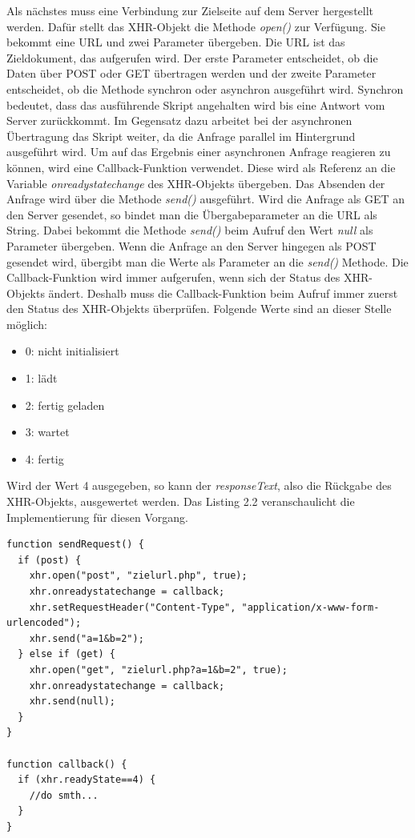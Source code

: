 Als n\"achstes muss eine Verbindung zur Zielseite auf dem Server hergestellt werden.
Daf\"ur stellt das XHR-Objekt die Methode \emph{open()} zur Verf\"ugung. 
Sie bekommt eine URL und zwei Parameter \"ubergeben.
Die URL ist das Zieldokument, das aufgerufen wird.
Der erste Parameter entscheidet, ob die Daten \"uber POST oder GET \"ubertragen werden und der zweite Parameter 
entscheidet, ob die Methode synchron oder asynchron ausgef\"uhrt wird.
Synchron bedeutet, dass das ausf\"uhrende Skript angehalten wird bis eine Antwort vom Server zur\"uckkommt.
Im Gegensatz dazu arbeitet bei der asynchronen \"Ubertragung das Skript weiter, da die Anfrage parallel im Hintergrund ausgef\"uhrt wird.
Um auf das Ergebnis einer asynchronen Anfrage reagieren zu k\"onnen, wird eine Callback-Funktion verwendet.
Diese wird als Referenz an die Variable \emph{onreadystatechange} des XHR-Objekts \"ubergeben. 
Das Absenden der Anfrage wird \"uber die Methode \emph{send()} ausgef\"uhrt.
Wird die Anfrage als GET an den Server gesendet, so bindet man die \"Ubergabeparameter an die URL als String.
Dabei bekommt die Methode \emph{send()} beim Aufruf den Wert \emph{null} als Parameter \"ubergeben.
Wenn die Anfrage an den Server hingegen als POST gesendet wird, \"ubergibt man die Werte als Parameter an die \emph{send()} Methode.
Die Callback-Funktion wird immer aufgerufen, wenn sich der Status des XHR-Objekts \"andert.
Deshalb muss die Callback-Funktion beim Aufruf immer zuerst den Status des XHR-Objekts \"uberpr\"ufen.
Folgende Werte sind an dieser Stelle m\"oglich:
\begin{itemize}
 \item 0: nicht initialisiert
 \item 1: l\"adt
 \item 2: fertig geladen
 \item 3: wartet
 \item 4: fertig
\end{itemize}

Wird der Wert 4 ausgegeben, so kann der \emph{responseText}, also die R\"uckgabe des XHR-Objekts, ausgewertet werden.
Das Listing 2.2 veranschaulicht die Implementierung f\"ur diesen Vorgang.\\

\begin{lstlisting}[caption={Verbindungsaufbau und Callback-Funktion bei Ajax}]
function sendRequest() {  
  if (post) {
    xhr.open("post", "zielurl.php", true);
    xhr.onreadystatechange = callback;
    xhr.setRequestHeader("Content-Type", "application/x-www-form-urlencoded");
    xhr.send("a=1&b=2");
  } else if (get) {
    xhr.open("get", "zielurl.php?a=1&b=2", true);
    xhr.onreadystatechange = callback;
    xhr.send(null);
  }
}

function callback() {
  if (xhr.readyState==4) {
    //do smth...
  }
}
\end{lstlisting}

